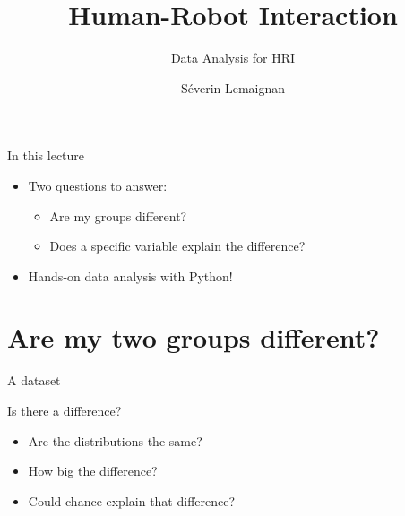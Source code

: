 \documentclass[compress]{beamer}
\title{Human-Robot Interaction}
\subtitle{Data Analysis for HRI}
\date{}
\author{Séverin Lemaignan}
\institute{{\bf Bristol Robotics Lab}\\University of the West of England}
\makeatletter
\let\beamer@writeslidentry@miniframeson=\beamer@writeslidentry
\def\beamer@writeslidentry@miniframesoff{%
  \expandafter\beamer@ifempty\expandafter{\beamer@framestartpage}{}%
  {%
    \clearpage\beamer@notesactions%
  }
}
\newcommand*{\miniframeson}{\let\beamer@writeslidentry=\beamer@writeslidentry@miniframeson}
\newcommand*{\miniframesoff}{\let\beamer@writeslidentry=\beamer@writeslidentry@miniframesoff}
\makeatother
\begin{document}
\miniframesoff


{
\maketitle
}

\miniframeson


\begin{frame}{In this lecture}

\begin{itemize}
    \item<+-> Two questions to answer:
        \begin{itemize}
            \item<+-> Are my groups different?
            \item<+-> Does a specific variable explain the difference?
        \end{itemize}
    \item<+-> Hands-on data analysis with Python!
\end{itemize}

\end{frame}




\section{Are my two groups different?}

\begin{frame}{A dataset}

    \centering

\end{frame}


\begin{frame}{}

    Is there a difference?

    \begin{itemize}
        \item Are the distributions the same?
        \item How big the difference?
        \item Could chance explain that difference?
    \end{itemize}
\end{frame}
\end{document}
